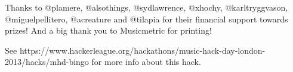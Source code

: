 \vspace{0.25cm}
\noindent
Thanks to @plamere, @alsothings, @sydlawrence, @xhochy, @karltryggvason, @miguelpellitero, @acreature and @tilapia for their financial support towards prizes! And a big thank you to Musicmetric for printing!
\vspace{0.25cm}

\noindent
See https://www.hackerleague.org/hackathons/music-hack-day-london-2013/hacks/mhd-bingo for more info about this hack.
\newpage